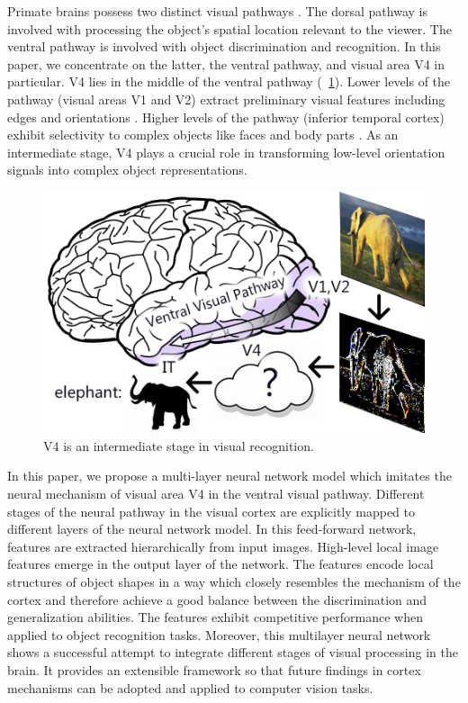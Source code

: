 \documentclass[5p]{elsarticle}
\begin{document}
Primate brains possess two distinct visual pathways \cite{ettlinger1990,lehky2007}.
The dorsal pathway is involved with processing the object's spatial location relevant to the viewer. 
The ventral pathway is involved with object discrimination and recognition.
In this paper, we concentrate on the latter, the ventral pathway, and visual area V4 in particular.
V4 lies in the middle of the ventral pathway (\figurename~\ref{fig:1}).
Lower levels of the pathway (visual areas V1 and V2) extract preliminary visual features 
including edges and orientations \cite{hubel1962,hubel1965}.
Higher levels of the pathway (inferior temporal cortex) exhibit selectivity to complex objects
like faces and body parts \cite{bruce1981,bell2009}.
As an intermediate stage, V4 plays a crucial role in transforming low-level orientation signals 
into complex object representations.

\begin{figure}
\centerline{\includegraphics[width=0.8\linewidth]{images/fig-1.png}} 
\caption{V4 is an intermediate stage in visual recognition.}
\label{fig:1}
\end{figure}

In this paper, we propose a multi-layer neural network model
which imitates the neural mechanism of visual area V4 in the ventral visual pathway.
Different stages of the neural pathway in the visual cortex
are explicitly mapped to different layers of the neural network model.
In this feed-forward network, features are extracted hierarchically from input images. 
High-level local image features emerge in the output layer of the network. 
The features encode local structures of object shapes in a way which closely resembles the mechanism of the cortex 
and therefore achieve a good balance between the discrimination and generalization abilities.
The features exhibit competitive performance when applied to object recognition tasks.
Moreover, this multilayer neural network shows a successful attempt 
to integrate different stages of visual processing in the brain. 
It provides an extensible framework so that future findings in cortex mechanisms 
can be adopted and applied to computer vision tasks.
\end{document}

